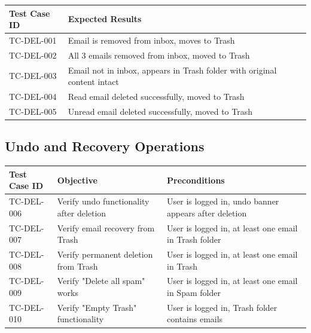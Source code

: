 \documentclass[12pt,a4paper]{article}
\begin{document}
\begin{table}[h!]
\centering
\begin{tabular}{|p{3cm}|p{7cm}|}
\hline
\textbf{Test Case ID} & \textbf{Expected Results} \\
\hline
TC-DEL-001 & Email is removed from inbox, moves to Trash \\
\hline
TC-DEL-002 & All 3 emails removed from inbox, moved to Trash \\
\hline
TC-DEL-003 & Email not in inbox, appears in Trash folder with original content intact \\
\hline
TC-DEL-004 & Read email deleted successfully, moved to Trash \\
\hline
TC-DEL-005 & Unread email deleted successfully, moved to Trash \\
\hline
\end{tabular}
\end{table}

\subsection{Undo and Recovery Operations}

\begin{table}[h!]
\centering
\begin{tabular}{|p{3cm}|p{5cm}|p{7cm}|}
\hline
\textbf{Test Case ID} & \textbf{Objective} & \textbf{Preconditions} \\
\hline
TC-DEL-006 & Verify undo functionality after deletion & User is logged in, undo banner appears after deletion \\
\hline
TC-DEL-007 & Verify email recovery from Trash & User is logged in, at least one email in Trash folder \\
\hline
TC-DEL-008 & Verify permanent deletion from Trash & User is logged in, at least one email in Trash \\
\hline
TC-DEL-009 & Verify "Delete all spam" works & User is logged in, at least one email in Spam folder \\
\hline
TC-DEL-010 & Verify "Empty Trash" functionality & User is logged in, Trash folder contains emails \\
\hline
\end{tabular}
\end{table}
\end{document}
